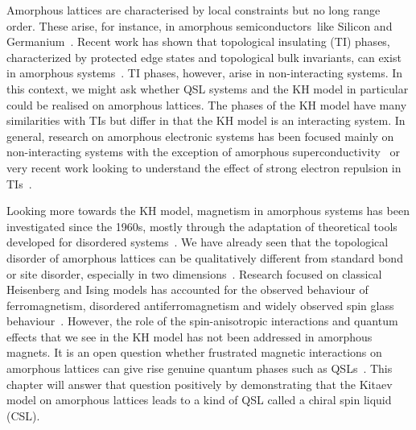 Amorphous lattices are characterised by local constraints but no long range order. These arise, for instance, in amorphous semiconductors~like Silicon and Germanium~\autocite{Yonezawa1983,zallen2008physics}. Recent work has shown that topological insulating (TI) phases, characterized by protected edge states and topological bulk invariants, can exist in amorphous systems~\autocite{mitchellAmorphousTopologicalInsulators2018,agarwala2019topological,marsalTopologicalWeaireThorpeModels2020,costa2019toward,agarwala2020higher,spring2021amorphous,corbae2019evidence}. TI phases, however, arise in non-interacting systems. In this context, we might ask whether QSL systems and the KH model in particular could be realised on amorphous lattices. The phases of the KH model have many similarities with TIs but differ in that the KH model is an interacting system. In general, research on amorphous electronic systems has been focused mainly on non-interacting systems with the exception of amorphous superconductivity~\autocite{buckel1954einfluss,mcmillan1981electron,meisel1981eliashberg,bergmann1976amorphous,mannaNoncrystallineTopologicalSuperconductors2022} or very recent work looking to understand the effect of strong electron repulsion in TIs~\autocite{kim2022fractionalization}.

Looking more towards the KH model, magnetism in amorphous systems has been investigated since the 1960s, mostly through the adaptation of theoretical tools developed for disordered systems~\autocite{aharony1975critical,Petrakovski1981,kaneyoshi1992introduction,Kaneyoshi2018}. We have already seen that the topological disorder of amorphous lattices can be qualitatively different from standard bond or site disorder, especially in two dimensions~\autocite{barghathiPhaseTransitionsRandom2014,schrauthViolationHarrisBarghathiVojtaCriterion2018}. Research focused on classical Heisenberg and Ising models has accounted for the observed behaviour of ferromagnetism, disordered antiferromagnetism and widely observed spin glass behaviour~\autocite{coey1978amorphous}. However, the role of the spin-anisotropic interactions and quantum effects that we see in the KH model has not been addressed in amorphous magnets. It is an open question whether frustrated magnetic interactions on amorphous lattices can give rise genuine quantum phases such as QSLs~\autocite{Anderson1973,Knolle2019,Savary2016,Lacroix2011}. This chapter will answer that question positively by demonstrating that the Kitaev model on amorphous lattices leads to a kind of QSL called a chiral spin liquid (CSL).

